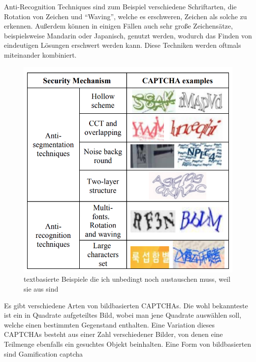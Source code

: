 Anti-Recognition Techniques sind zum Beispiel verschiedene Schriftarten, die Rotation von Zeichen und ``Waving'', 
welche es erschweren, Zeichen als solche zu erkennen. 
Außerdem können in einigen Fällen auch sehr große Zeichensätze, beispielsweise Mandarin oder Japanisch, genutzt werden, 
wodurch das Finden von eindeutigen Lösungen erschwert werden kann.
Diese Techniken werden oftmals miteinander kombiniert.
\cite[p.77]{surveyofresearch}

\begin{figure}
    \centering
    \includegraphics{gfx/mygraphics/unbedingtaustauschen1.png}
    \caption{textbasierte Beispiele die ich unbedingt noch austauschen muss, weil sie aus \cite{surveyofresearch} sind}
\end{figure}

Es gibt verschiedene Arten von bildbasierten CAPTCHAs. 
Die wohl bekannteste ist ein in Quadrate aufgeteiltes Bild, wobei man jene Quadrate auswählen soll, welche einen bestimmten Gegenstand enthalten.
Eine Variation dieses CAPTCHAs besteht aus einer Zahl verschiedener Bilder, von denen eine Teilmenge ebenfalls ein gesuchtes Objekt beinhalten.
Eine Form von bildbasierten sind Gamification captcha

